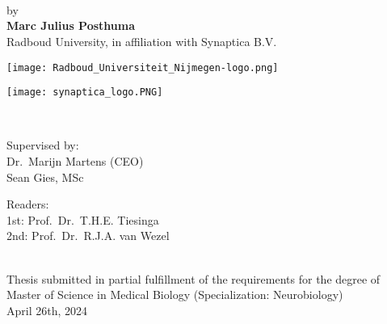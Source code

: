 \documentclass[12pt]{report}
\begin{document}
\begin{titlepage}
    \centering
    \vspace*{1cm}
    \\
    \\
    \\[1cm]
    \Large by\\[1cm]
    \Large \textbf{Marc Julius Posthuma}\\[1cm]
    \Large Radboud University, in affiliation with Synaptica B.V.\\[2cm]
    \begin{minipage}[c]{0.5\textwidth}
        \centering
        \texttt{[image: Radboud\_Universiteit\_Nijmegen-logo.png]}
    \end{minipage}%
    \begin{minipage}[c]{0.5\textwidth}
        \centering
        \texttt{[image: synaptica\_logo.PNG]}
    \end{minipage}\\[1cm]
    \vfill
    \begin{minipage}[t]{0.5\textwidth}
        \centering
        \Large Supervised by:\\
        Dr.\ Marijn Martens (CEO)\\
        Sean Gies, MSc
    \end{minipage}%
    \begin{minipage}[t]{0.5\textwidth}
        \centering
        \Large Readers:\\
        1st: Prof.\ Dr.\ T.H.E. Tiesinga\\
        2nd: Prof.\ Dr.\ R.J.A. van Wezel
    \end{minipage}\\[2cm]

    \footnotesize Thesis submitted in partial fulfillment of the requirements
    for the degree of Master of Science in Medical Biology (Specialization: Neurobiology)\\[1cm]
    \Large April 26th, 2024
\end{titlepage}

\listoftodos%





\tableofcontents
\listoffigures
\listoftables




\printbibliography%
\appendix



\end{document}
